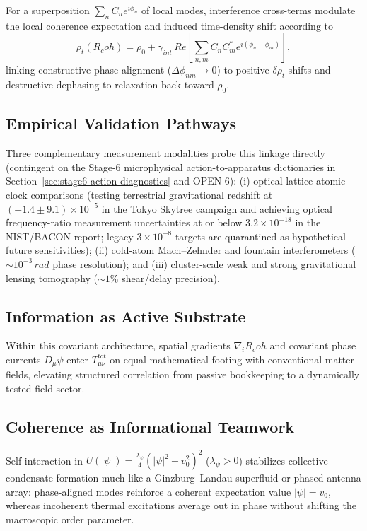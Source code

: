\documentclass[american,11pt,letterpaper]{article}
\newcommand{\Rcoh}{R_{\mathrm{coh}}}
\def\mathrm#1{#1}%
\def\texttt#1{#1}%
\def\Rcoh{R_coh}%
\begin{document}
For a superposition $\sum_n C_n e^{i\phi_n}$ of local modes, interference cross-terms modulate the local coherence expectation and induced time-density shift according to
\begin{equation}
\rho_t(\Rcoh) = \rho_0 + \gamma_{\mathrm{int}}\,\mathrm{Re}\!\left[\sum_{n,m} C_n C_m^* e^{i(\phi_n - \phi_m)}\right],
\end{equation}
linking constructive phase alignment ($\Delta\phi_{nm} \to 0$) to positive $\delta\rho_t$ shifts and destructive dephasing to relaxation back toward $\rho_0$.

\subsection{Empirical Validation Pathways}

Three complementary measurement modalities probe this linkage directly (contingent on the Stage-6 microphysical action-to-apparatus dictionaries in Section~\ref{sec:stage6-action-diagnostics} and \texttt{OPEN-6}): (i) optical-lattice atomic clock comparisons (testing terrestrial gravitational redshift at $(+1.4 \pm 9.1)\times 10^{-5}$ in the Tokyo Skytree campaign and achieving optical frequency-ratio measurement uncertainties at or below $3.2\times 10^{-18}$ in the NIST/BACON report; legacy $3\times 10^{-8}$ targets are quarantined as hypothetical future sensitivities); (ii) cold-atom Mach--Zehnder and fountain interferometers ($\sim 10^{-3}\,\mathrm{rad}$ phase resolution); and (iii) cluster-scale weak and strong gravitational lensing tomography ($\sim 1\%$ shear/delay precision).

\subsection{Information as Active Substrate}

Within this covariant architecture, spatial gradients $\nabla_i\Rcoh$ and covariant phase currents $D_\mu\psi$ enter $T_{\mu\nu}^{\mathrm{tot}}$ on equal mathematical footing with conventional matter fields, elevating structured correlation from passive bookkeeping to a dynamically tested field sector.

\subsection{Coherence as Informational Teamwork}

Self-interaction in $U(|\psi|) = \frac{\lambda_\psi}{4}(|\psi|^2 - v_0^2)^2$ ($\lambda_\psi > 0$) stabilizes collective condensate formation much like a Ginzburg--Landau superfluid or phased antenna array: phase-aligned modes reinforce a coherent expectation value $|\psi| = v_0$, whereas incoherent thermal excitations average out in phase without shifting the macroscopic order parameter.
\end{document}
